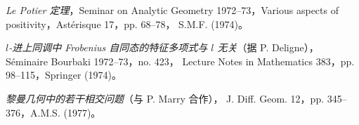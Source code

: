 \begin{description}
\item[{[21]}] \emph{Le Potier 定理}，Seminar on Analytic Geometry
1972--73，Various aspects of positivity，Astérisque 17，pp. 68--78，
S.M.F. (1974)。

\item[{[22]}] \emph{$l$-进上同调中 Frobenius 自同态的特征多项式与 $l$
无关}（据 P. Deligne），Séminaire Bourbaki 1972--73，no. 423，
Lecture Notes in Mathematics 383，pp. 98--115，Springer (1974)。

\item[{[23]}] \emph{黎曼几何中的若干相交问题}（与 P. Marry 合作），
J. Diff. Geom. 12，pp. 345--376，A.M.S. (1977)。
\end{description}
\normalsize
